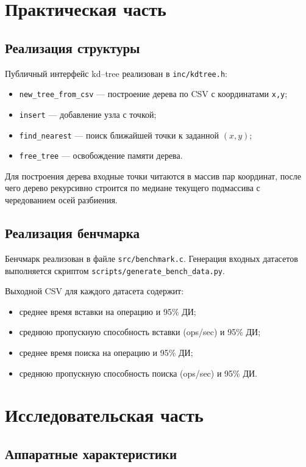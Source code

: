 \documentclass{itmo}
\begin{document}
\chapter{Практическая часть}

\section{Реализация структуры}

Публичный интерфейс kd--tree реализован в \texttt{inc/kdtree.h}:
\begin{itemize}
	\item \texttt{new\_tree\_from\_csv} --- построение дерева по CSV с координатами \texttt{x,y};
	\item \texttt{insert} --- добавление узла с точкой;
	\item \texttt{find\_nearest} --- поиск ближайшей точки к заданной $(x,y)$;
	\item \texttt{free\_tree} --- освобождение памяти дерева.
\end{itemize}

Для построения дерева входные точки читаются в массив пар координат, после чего дерево рекурсивно строится по медиане текущего подмассива с чередованием осей разбиения.

\section{Реализация бенчмарка}

Бенчмарк реализован в файле \texttt{src/benchmark.c}.
Генерация входных датасетов выполняется скриптом \texttt{scripts/generate\_bench\_data.py}.

Выходной CSV для каждого датасета содержит:
\begin{itemize}
	\item среднее время вставки на операцию и 95\% ДИ;
	\item среднюю пропускную способность вставки (ops/sec) и 95\% ДИ;
	\item среднее время поиска на операцию и 95\% ДИ;
	\item среднюю пропускную способность поиска (ops/sec) и 95\% ДИ.
\end{itemize}

\chapter{Исследовательская часть}

\section{Аппаратные характеристики}
\end{document}
